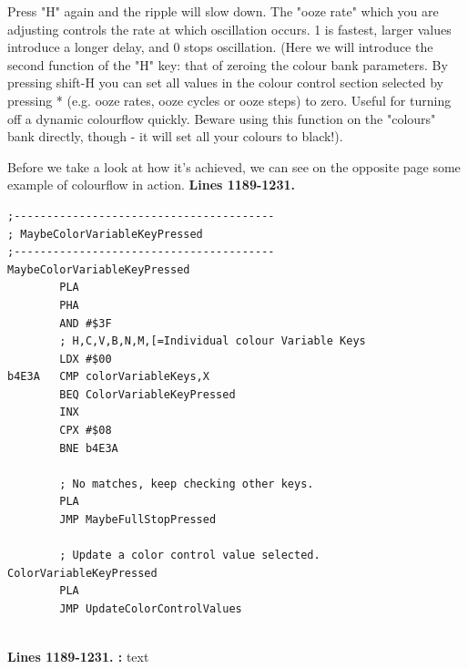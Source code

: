 \begin{definition}
Press "H" again and the ripple will slow down.  The "ooze rate" which you are
adjusting controls the rate at which oscillation occurs.  1 is fastest, larger
values introduce a longer delay, and 0 stops oscillation.  (Here we will
introduce the second function of the "H" key:  that of zeroing the colour bank
parameters.  By pressing shift-H you can set all values in the colour control
section selected by pressing * (e.g. ooze rates, ooze cycles or ooze steps) to
zero.  Useful for turning off a dynamic colourflow quickly.  Beware using this
function on the "colours" bank directly, though - it will set all your colours
to black!).

\end{definition}
\clearpage


\clearpage
Before we take a look at how it's achieved, we can see on the opposite page
some example of colourflow in action.
\clearpage
\textbf{Lines 1189-1231. } 
\begin{lstlisting}
;----------------------------------------
; MaybeColorVariableKeyPressed   
;----------------------------------------
MaybeColorVariableKeyPressed   
        PLA 
        PHA 
        AND #$3F
        ; H,C,V,B,N,M,[=Individual colour Variable Keys 
        LDX #$00
b4E3A   CMP colorVariableKeys,X
        BEQ ColorVariableKeyPressed
        INX 
        CPX #$08
        BNE b4E3A

        ; No matches, keep checking other keys.
        PLA 
        JMP MaybeFullStopPressed

        ; Update a color control value selected.
ColorVariableKeyPressed   
        PLA 
        JMP UpdateColorControlValues


\end{lstlisting}
\clearpage

\textbf{Lines 1189-1231. :} 
text
\clearpage


